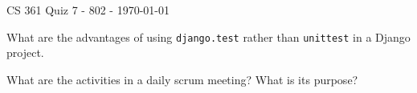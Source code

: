 \documentclass{exam}
\begin{document}
	
	\begin{center}
		CS 361 Quiz 7 - 802 - \today
	\end{center}
	
	\vspace{1em}
	
	\begin{center}
	\end{center}
	
	\begin{questions}
		
		\question[5] What are the advantages of using \texttt{django.test} rather than \texttt{unittest} in a Django project.
		\vfill
		
		\question[5] What are the activities in a daily scrum meeting? What is its purpose?
		\vfill
	\end{questions}
	
\end{document}
